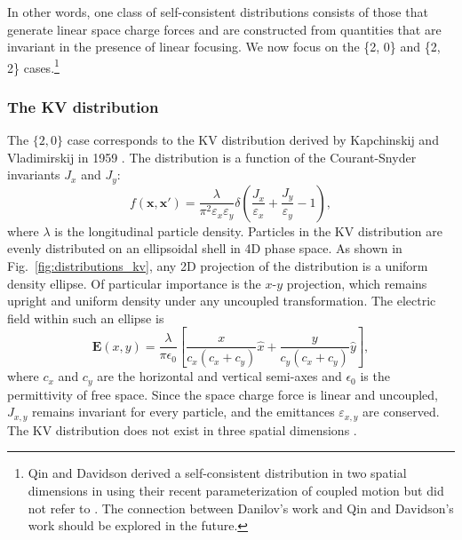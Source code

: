 In other words, one class of self-consistent distributions consists of those that generate linear space charge forces and are constructed from quantities that are invariant in the presence of linear focusing. We now focus on the \{2, 0\} and \{2, 2\} cases.\footnote{Qin and Davidson derived a self-consistent distribution in two spatial dimensions in \cite{Qin2013} using their recent parameterization of coupled motion but did not refer to \cite{Danilov2003}. The connection between Danilov's work and Qin and Davidson's work should be explored in the future.}


\subsubsection{The KV distribution}

The $\{2, 0\}$ case corresponds to the KV distribution derived by Kapchinskij and Vladimirskij in 1959 \cite{Kapchinskij1959}. The distribution is a function of the Courant-Snyder invariants $J_x$ and $J_y$:
%
\begin{equation}
    f(\mathbf{x}, \mathbf{x}') = \frac{\lambda}{\pi^2 \varepsilon_x\varepsilon_y}
    \delta \left(\frac{J_x}{\varepsilon_x} + \frac{J_y}{\varepsilon_y} -1 \right),
\end{equation}
%
where $\lambda$ is the longitudinal particle density. Particles in the KV distribution are evenly distributed on an ellipsoidal shell in 4D phase space. As shown in Fig.~\ref{fig:distributions_kv}, any 2D projection of the distribution is a uniform density ellipse. Of particular importance is the $x$-$y$ projection, which remains upright and uniform density under any uncoupled transformation. The electric field within such an ellipse is
%
\begin{equation}  \label{eq:field_in_upright_ellipse}
    \mathbf{E}(x, y) =
    \frac{\lambda}{\pi\epsilon_0}
    \left[ 
        \frac{x}{c_x\left(c_x+c_y\right)} \hat{x}
        + \frac{y}{c_y\left(c_x+c_y\right)} \hat{y}
    \right],
\end{equation}
%
where $c_x$ and $c_y$ are the horizontal and vertical semi-axes and $\epsilon_0$ is the permittivity of free space. Since the space charge force is linear and uncoupled, $J_{x,y}$ remains invariant for every particle, and the emittances $\varepsilon_{x,y}$ are conserved. The KV distribution does not exist in three spatial dimensions \cite{Sacherer1968}.

